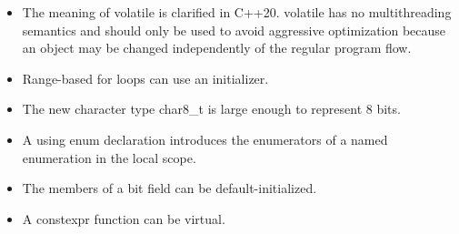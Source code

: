 \begin{tcolorbox}[breakable,enhanced jigsaw,colback=mygreen!5!white,colframe=mygreen!75!black,title={Distilled Information}]
\begin{itemize}
\item 
The meaning of volatile is clarified in C++20. volatile has no multithreading semantics and should only be used to avoid aggressive optimization because an object may be changed independently of the regular program flow.

\item 
Range-based for loops can use an initializer.

\item 
The new character type char8\_t is large enough to represent 8 bits.

\item 
A using enum declaration introduces the enumerators of a named enumeration in the local scope.

\item 
The members of a bit field can be default-initialized.

\item 
A constexpr function can be virtual.
\end{itemize}
\end{tcolorbox}























